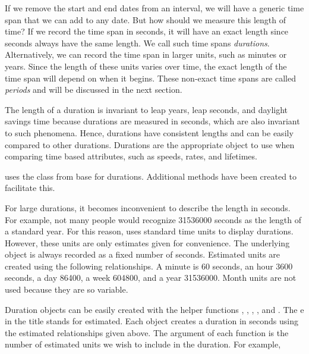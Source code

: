 \documentclass[article]{jss}
\begin{document}
If we remove the start and end dates from an interval, we will have a generic time span that we can add to any date. But how should we measure this length of time? If we record the time span in seconds, it will have an exact length since seconds always have the same length. We call such time spans \emph{durations}. Alternatively, we can record the time span in larger units, such as minutes or years. Since the length of these units varies over time, the exact length of the time span will depend on when it begins. These non-exact time spans are called \emph{periods} and will be discussed in the next section.

The length of a duration is invariant to leap years, leap seconds, and daylight savings time because durations are measured in seconds, which are also invariant to such phenomena. Hence, durations have consistent lengths and can be easily compared to other durations. Durations are the appropriate object to use when comparing time based attributes, such as speeds, rates, and lifetimes.

 uses the  class from base  for durations. Additional  methods have been created to facilitate this. 

For large durations, it becomes inconvenient to describe the length in seconds. For example, not many people would recognize 31536000 seconds as the length of a standard year. For this reason,  uses standard time units to display durations. However, these units are only estimates given for convenience. The underlying object is always recorded as a fixed number of seconds. Estimated units are created using the following relationships. A minute is 60 seconds, an hour 3600 seconds, a day 86400, a week 604800, and a year 31536000. Month units are not used because they are so variable.

Duration objects can be easily created with the helper functions 
, , , , and  . The e in the title stands for estimated. Each object creates a duration in seconds using the estimated relationships given above. The argument of each function is the number of estimated units we wish to include in the duration. For example,\\

\\
\\

\\
\\
\end{document}
